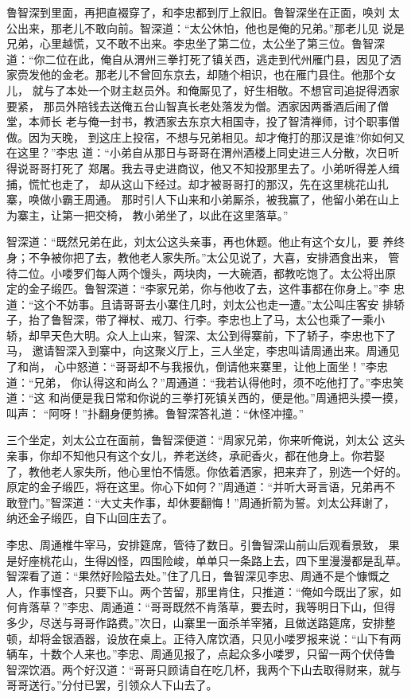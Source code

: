 鲁智深到里面，再把直裰穿了，和李忠都到厅上叙旧。鲁智深坐在正面，唤刘
太公出来，那老儿不敢向前。智深道：“太公休怕，他也是俺的兄弟。”那老儿见
说是兄弟，心里越慌，又不敢不出来。李忠坐了第二位，太公坐了第三位。鲁智深
道：“你二位在此，俺自从渭州三拳打死了镇关西，逃走到代州雁门县，因见了洒
家赍发他的金老。那老儿不曾回东京去，却随个相识，也在雁门县住。他那个女儿，
就与了本处一个财主赵员外。和俺厮见了，好生相敬。不想官司追捉得洒家要紧，
那员外陪钱去送俺五台山智真长老处落发为僧。洒家因两番酒后闹了僧堂，本师长
老与俺一封书，教洒家去东京大相国寺，投了智清禅师，讨个职事僧做。因为天晚，
到这庄上投宿，不想与兄弟相见。却才俺打的那汉是谁?你如何又在这里？”李忠
道：“小弟自从那日与哥哥在渭州酒楼上同史进三人分散，次日听得说哥哥打死了
郑屠。我去寻史进商议，他又不知投那里去了。小弟听得差人缉捕，慌忙也走了，
却从这山下经过。却才被哥哥打的那汉，先在这里桃花山扎寨，唤做小霸王周通。
那时引人下山来和小弟厮杀，被我赢了，他留小弟在山上为寨主，让第一把交椅，
教小弟坐了，以此在这里落草。”

智深道：“既然兄弟在此，刘太公这头亲事，再也休题。他止有这个女儿，要
养终身；不争被你把了去，教他老人家失所。”太公见说了，大喜，安排酒食出来，
管待二位。小喽罗们每人两个馒头，两块肉，一大碗酒，都教吃饱了。太公将出原
定的金子缎匹。鲁智深道：“李家兄弟，你与他收了去，这件事都在你身上。”李
忠道：“这个不妨事。且请哥哥去小寨住几时，刘太公也走一遭。”太公叫庄客安
排轿子，抬了鲁智深，带了禅杖、戒刀、行李。李忠也上了马，太公也乘了一乘小
轿，却早天色大明。众人上山来，智深、太公到得寨前，下了轿子，李忠也下了马，
邀请智深入到寨中，向这聚义厅上，三人坐定，李忠叫请周通出来。周通见了和尚，
心中怒道：“哥哥却不与我报仇，倒请他来寨里，让他上面坐！”李忠道：“兄弟，
你认得这和尚么？”周通道：“我若认得他时，须不吃他打了。”李忠笑道：“这
和尚便是我日常和你说的三拳打死镇关西的，便是他。”周通把头摸一摸，叫声：
“阿呀！”扑翻身便剪拂。鲁智深答礼道：“休怪冲撞。”

三个坐定，刘太公立在面前，鲁智深便道：“周家兄弟，你来听俺说，刘太公
这头亲事，你却不知他只有这个女儿，养老送终，承祀香火，都在他身上。你若娶
了，教他老人家失所，他心里怕不情愿。你依着洒家，把来弃了，别选一个好的。
原定的金子缎匹，将在这里。你心下如何？”周通道：“并听大哥言语，兄弟再不
敢登门。”智深道：“大丈夫作事，却休要翻悔！”周通折箭为誓。刘太公拜谢了，
纳还金子缎匹，自下山回庄去了。

李忠、周通椎牛宰马，安排筵席，管待了数日。引鲁智深山前山后观看景致，
果是好座桃花山，生得凶怪，四围险峻，单单只一条路上去，四下里漫漫都是乱草。
智深看了道：“果然好险隘去处。”住了几日，鲁智深见李忠、周通不是个慷慨之
人，作事悭吝，只要下山。两个苦留，那里肯住，只推道：“俺如今既出了家，如
何肯落草？”李忠、周通道：“哥哥既然不肯落草，要去时，我等明日下山，但得
多少，尽送与哥哥作路费。”次日，山寨里一面杀羊宰猪，且做送路筵席，安排整
顿，却将金银酒器，设放在桌上。正待入席饮酒，只见小喽罗报来说：“山下有两
辆车，十数个人来也。”李忠、周通见报了，点起众多小喽罗，只留一两个伏侍鲁
智深饮酒。两个好汉道：“哥哥只顾请自在吃几杯，我两个下山去取得财来，就与
哥哥送行。”分付已罢，引领众人下山去了。

